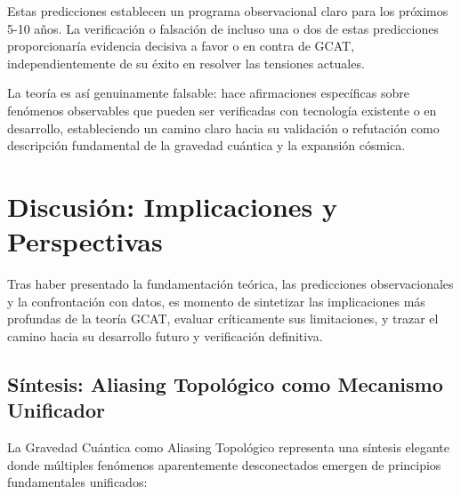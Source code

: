 \documentclass[12pt, a4paper]{article}
\theoremstyle{plain}
\theoremstyle{definition}
\begin{document}
Estas predicciones establecen un programa observacional claro para los próximos 5-10 años. La verificación o falsación de incluso una o dos de estas predicciones proporcionaría evidencia decisiva a favor o en contra de GCAT, independientemente de su éxito en resolver las tensiones actuales.

La teoría es así genuinamente falsable: hace afirmaciones específicas sobre fenómenos observables que pueden ser verificadas con tecnología existente o en desarrollo, estableciendo un camino claro hacia su validación o refutación como descripción fundamental de la gravedad cuántica y la expansión cósmica.


\section{Discusión: Implicaciones y Perspectivas}
\label{sec:discusion}

Tras haber presentado la fundamentación teórica, las predicciones observacionales y la confrontación con datos, es momento de sintetizar las implicaciones más profundas de la teoría GCAT, evaluar críticamente sus limitaciones, y trazar el camino hacia su desarrollo futuro y verificación definitiva.

\subsection{Síntesis: Aliasing Topológico como Mecanismo Unificador}

La Gravedad Cuántica como Aliasing Topológico representa una síntesis elegante donde múltiples fenómenos aparentemente desconectados emergen de principios fundamentales unificados:
\end{document}

